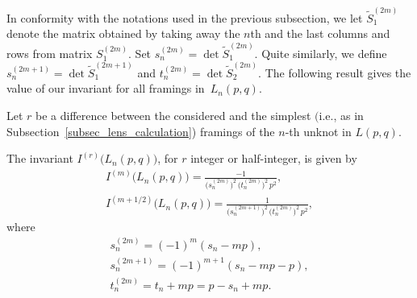 \documentclass[pdftex]{sigma}
\begin{document}
In conformity with the notations used in the previous subsection, we let $\widetilde S_1^{(2m)}$ denote the matrix obtained by taking away the
$n$th and the last columns and rows from matrix $S_1^{(2m)}$. Set $s_n^{(2m)} = \det \widetilde S_1^{(2m)}$. Quite similarly, we def\/ine $s_n^{(2m+1)} = \det \widetilde S_1^{(2m+1)}$ and $t_n^{(2m)} = \det \widetilde S_2^{(2m)}$. The following result gives the value of our invariant for all framings in~$L_n(p,q)$.
\begin{theorem}
\label{th_snmtnm}
Let $r$ be a difference between the considered and the simplest $($i.e., as in Subsection~{\rm \ref{subsec_lens_calculation})} framings of the $n$-th unknot in $L(p, q)$.

 The invariant $I^{(r)}\bigl(L_n(p,q)\bigr)$, for $r$ integer or half-integer, is given by
\begin{gather}
I^{(m)}\bigl(L_n(p,q)\bigr) = \frac{- 1}{\bigl(s_n^{(2m)}\bigr)^2 \, \bigl(t_n^{(2m)}\bigr)^2 \, p^2},
\label{eq_InG1}
\\
I^{(m + 1/2)}\bigl(L_n(p,q)\bigr) = \frac{1}{\bigl(s_n^{(2m+1)}\bigr)^2 \, \bigl(t_n^{(2m)}\bigr)^2 \, p^2},
\label{eq_InG2}
\end{gather}
where
\begin{gather}
s_n^{(2m)} = (- 1)^m (s_n - m p), \label{eq_sn2m}
\\
s_n^{(2m + 1)} = (- 1)^{m+1} (s_n - m p - p), \label{eq_sn2m1}
\\
t_n^{(2m)} = t_n + m p = p - s_n + m p. \label{eq_tn2m}
\end{gather}
\end{theorem}
\end{document}
